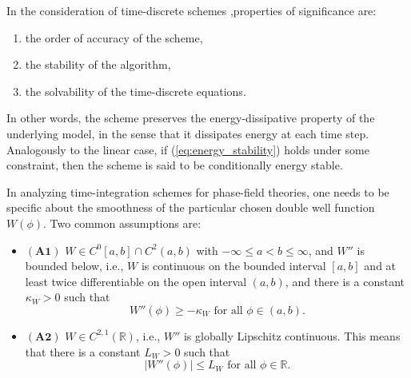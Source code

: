 \documentclass{article}
\begin{document}
In the consideration of time-discrete schemes \cite{Hairer1987, Hughes2012},properties of significance are:
\begin{enumerate}
    \item the order of accuracy of the scheme,
    \item the stability of the algorithm,
    \item the solvability of the time-discrete equations.
\end{enumerate}


In other words, the scheme preserves the energy-dissipative property of the underlying model, in the sense that it dissipates energy at each time step. Analogously to the linear case, if (\ref{eq:energy_stability}) holds under some constraint, then the scheme is said to be conditionally energy stable.

In analyzing time-integration schemes for phase-field theories, one needs to be specific about the smoothness of the particular chosen double well function $W(\phi)$. Two common assumptions are:

\begin{itemize}
    \item $\mathbf{(A1)}$ $W \in C^0[a, b] \cap C^2(a, b)$ with $-\infty \leq a < b \leq \infty$, and $W''$ is bounded below, i.e., $W$ is continuous on the bounded interval $[a, b]$ and at least twice differentiable on the open interval $(a, b)$, and there is a constant $\kappa_W > 0$ such that
    \begin{equation}
        W''(\phi) \geq -\kappa_W \text{ for all } \phi \in (a, b).
    \end{equation}
    \item $\mathbf{(A2)}$ $W \in C^{2,1}(\mathbb{R})$, i.e., $W''$ is globally Lipschitz continuous. This means that there is a constant $L_W > 0$ such that
    \begin{equation}
        \left|W''(\phi)\right| \leq L_W \text{ for all } \phi \in \mathbb{R}.
    \end{equation}
\end{itemize}
\end{document}
